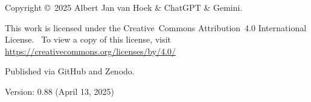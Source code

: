 \newpage
\thispagestyle{empty} %
\vspace*{0.1\textheight} %

\noindent %
Copyright \copyright\ 2025 Albert Jan van Hoek \& ChatGPT \& Gemini. %

\bigskip %

\noindent %
This work is licensed under the Creative Commons Attribution 4.0 International License.%
\ To view a copy of this license, visit\\
\url{https://creativecommons.org/licenses/by/4.0/}

\bigskip %

\noindent %
Published via GitHub and Zenodo.

\bigskip

\noindent %
Version: 0.88 (April 13, 2025) %


\vfill %
\cleardoublepage %
